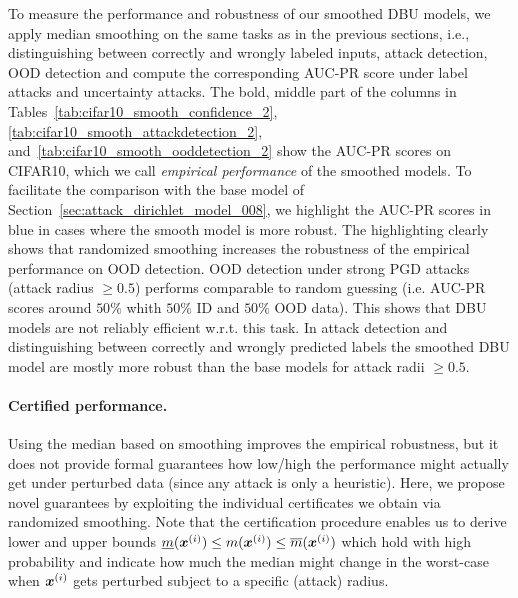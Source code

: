 To measure the performance and robustness of our smoothed DBU models, we apply median smoothing on the same tasks as in the previous sections, i.e., distinguishing between correctly and wrongly labeled inputs, attack detection, OOD detection and compute the corresponding AUC-PR score under label attacks and uncertainty attacks. 
The bold, middle part of the columns in Tables~\ref{tab:cifar10_smooth_confidence_2}, \ref{tab:cifar10_smooth_attackdetection_2}, and~\ref{tab:cifar10_smooth_ooddetection_2} show the AUC-PR scores on CIFAR10, which we call \emph{empirical performance} of the smoothed models. To facilitate the comparison with the base model of Section~\ref{sec:attack_dirichlet_model_008}, we highlight the AUC-PR scores in blue in cases where the smooth model is more robust. The highlighting clearly shows that randomized smoothing increases the robustness of the empirical performance on OOD detection. 
OOD detection under strong PGD attacks (attack radius $\geq 0.5$) performs comparable to random guessing (i.e. AUC-PR scores around $50\%$ whith $50\%$ ID and $50\%$ OOD data). This shows that DBU models are not reliably efficient w.r.t. this task.
In attack detection and distinguishing between correctly and wrongly predicted labels the smoothed DBU model are mostly more robust than the base models for attack radii $\geq 0.5$.

\paragraph{Certified performance.} Using the median based on smoothing improves the empirical robustness, but it does not provide formal guarantees how low/high the performance might actually get under perturbed data (since any attack is only a heuristic). 
Here, we propose novel guarantees by exploiting the individual certificates we obtain via randomized smoothing.
 Note that the certification procedure \citep{median_smoothing} enables us to derive lower and upper bounds $\underline{m}({\bm{x}}^{(i)}) \leq m({\bm{x}}^{(i)}) \leq \overline{m}({\bm{x}}^{(i)})$ which hold with high probability and indicate how much the median might change in the worst-case when ${\bm{x}}^{(i)}$ gets perturbed subject to a specific (attack) radius.
 

